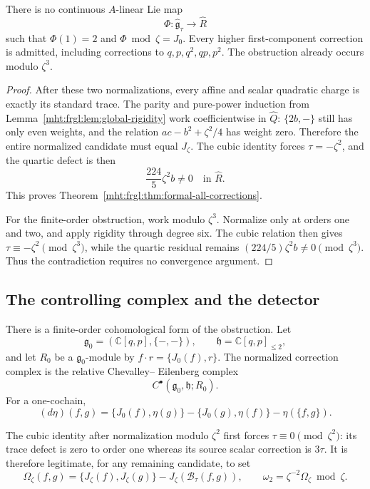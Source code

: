 \begin{theorem}
\label{mht:frgl:thm:formal-all-corrections}
There is no continuous $A$-linear Lie map
\[
 \Phi:\widehat{\mathfrak g}_\tau\longrightarrow\widehat R
\]
such that $\Phi(1)=2$ and $\Phi\bmod\zeta=J_0$.
Every higher first-component correction is admitted, including
corrections to $q,p,q^2,qp,p^2$.
The obstruction already occurs modulo $\zeta^3$.
\end{theorem}

\begin{proof}
After these two normalizations, every affine and scalar quadratic
charge is exactly its standard trace. The parity and pure-power
induction from Lemma~\ref{mht:frgl:lem:global-rigidity} work coefficientwise in
$\widehat Q$: $\{2b,-\}$ still has only even weights, and the
relation $ac-b^2+\zeta^2/4$ has weight zero. Therefore the entire
normalized candidate must equal $J_\zeta$.
The cubic identity forces $\tau=-\zeta^2$, and the quartic
defect is then
\[
 \frac{224}{5}\zeta^2b\ne0\quad\text{in }\widehat R.
\]
This proves Theorem~\ref{mht:frgl:thm:formal-all-corrections}.

For the finite-order obstruction, work modulo $\zeta^3$. Normalize
only at orders one and two, and apply rigidity through degree six.
The cubic relation then gives
$\tau\equiv-\zeta^2\pmod{\zeta^3}$, while the quartic residual
remains $(224/5)\zeta^2b\ne0\pmod{\zeta^3}$.
Thus the contradiction requires no convergence argument.
\end{proof}

\subsection{The controlling complex and the detector}

There is a finite-order cohomological form of the obstruction.
Let
\[
 \mathfrak g_0=(\mathbb C[q,p],\{-,-\}),\qquad
 \mathfrak h=\mathbb C[q,p]_{\le2},
\]
and let $R_0$ be a $\mathfrak g_0$-module by
$f\cdot r=\{J_0(f),r\}$.
The normalized correction complex is the relative Chevalley--
Eilenberg complex
\[
 C^\bullet(\mathfrak g_0,\mathfrak h;R_0).
\]
For a one-cochain,
\[
 (d\eta)(f,g)=\{J_0(f),\eta(g)\}
             -\{J_0(g),\eta(f)\}-\eta(\{f,g\}).
\]

The cubic identity after normalization modulo $\zeta^2$ first
forces $\tau\equiv0\pmod{\zeta^2}$: its trace defect is zero
to order one whereas its source scalar correction is $3\tau$.
It is therefore legitimate, for any remaining candidate, to set
\[
 \Omega_\zeta(f,g)
 =\{J_\zeta(f),J_\zeta(g)\}
      -J_\zeta(\mathcal B_\tau(f,g)),\qquad
 \omega_2=\zeta^{-2}\Omega_\zeta\bmod\zeta.
\]

